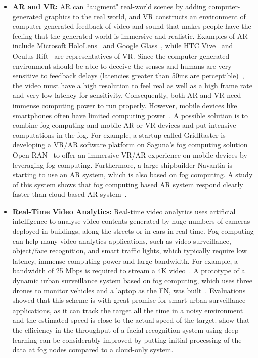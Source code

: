 \documentclass[11pt]{phdthesis}
\begin{document}
\begin{itemize}
	\item \textbf{AR and VR:} AR can ``augment" real-world scenes by adding computer-generated graphics to the real world, and VR constructs an environment of computer-generated feedback of video and sound that makes people have the feeling that the generated world is immersive and realistic. Examples of AR include Microsoft HoloLens~\citep{evans2017evaluating} and Google Glass~\citep{muensterer2014google}, while HTC Vive~\citep{dempsey2016teardown} and Oculus Rift~\citep{desai2014review} are representatives of VR. Since the computer-generated environment should be able to deceive the senses and humans are very sensitive to feedback delays (latencies greater than 50ms are perceptible)~\citep{brooks1999s}, the video must have a high resolution to feel real as well as a high frame rate and very low latency for sensitivity. Consequently, both AR and VR need immense computing power to run properly. However, mobile devices like smartphones often have limited computing power~\citep{yang2018communication}. A possible solution is to combine fog computing and mobile AR or VR devices and put intensive computations in the fog. For example, a startup called GridRaster is developing a VR/AR software platform on Saguna's fog computing solution Open-RAN~\citep{alto2018VR} to offer an immersive VR/AR experience on mobile devices by leveraging fog computing. Furthermore, a large shipbuilder Navantia is starting to use an AR system, which is also based on fog computing. A study of this system shows that fog computing based AR system respond clearly faster than cloud-based AR system~\citep{fernandez2018fog}.
	
	\item \textbf{Real-Time Video Analytics:} Real-time video analytics uses artificial intelligence to analyse video contents generated by huge numbers of cameras deployed in buildings, along the streets or in cars in real-time. Fog computing can help many video analytics applications, such as video surveillance, object/face recognition, and smart traffic lights, which typically require low latency, immense computing power and large bandwidth. For example, a bandwidth of 25 Mbps is required to stream a 4K video~\citep{ananthanarayanan2017real}. A prototype of a dynamic urban surveillance system based on fog computing, which uses three drones to monitor vehicles and a laptop as the FN, was built~\citep{chen2016dynamic}. Evaluations showed that this scheme is with great promise for smart urban surveillance applications, as it can track the target all the time in a noisy environment and the estimated speed is close to the actual speed of the target. \citet{ali2018edge} show that the efficiency in the throughput of a facial recognition system using deep learning can be considerably improved by putting initial processing of the data at fog nodes compared to a cloud-only system.
	

\end{itemize}
\end{document}
